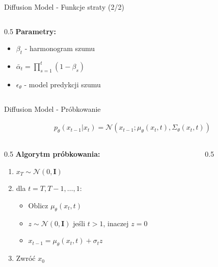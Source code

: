 \documentclass{beamer}
\begin{document}
\begin{frame}{Diffusion Model - Funkcje straty (2/2)}
\begin{columns}
        \begin{column}{0.5\textwidth}
            \textbf{Parametry:}
            \begin{itemize}
                \item $\beta_t$ - harmonogram szumu
                \item $\bar{\alpha}_t = \prod_{s=1}^{t} (1-\beta_s)$
                \item $\epsilon_\theta$ - model predykcji szumu
            \end{itemize}
        \end{column}
    \end{columns}
\end{frame}

\begin{frame}{Diffusion Model - Próbkowanie}
    \begin{tcolorbox}[colback=yellow!10!white, colframe=black!60, boxrule=0.5pt, arc=3mm, boxsep=0pt, top=0pt, bottom=0pt]
        \vspace{-5pt}
        \begin{align*}
            p_\theta(x_{t-1}|x_t) = \mathcal{N}(x_{t-1}; \mu_\theta(x_t, t), \Sigma_\theta(x_t, t))
        \end{align*}
        \vspace{-8pt}
    \end{tcolorbox}

    \begin{columns}
        \begin{column}{0.5\textwidth}
            \textbf{Algorytm próbkowania:}
            \begin{enumerate}
                \item $x_T \sim \mathcal{N}(0, \mathbf{I})$
                \item dla $t = T, T-1, \ldots, 1$:
                      \begin{itemize}
                          \item Oblicz $\mu_\theta(x_t, t)$
                          \item $z \sim \mathcal{N}(0, \mathbf{I})$ jeśli $t > 1$, inaczej $z = 0$
                          \item $x_{t-1} = \mu_\theta(x_t, t) + \sigma_t z$
                      \end{itemize}
                \item Zwróć $x_0$
            \end{enumerate}
        \end{column}
        \begin{column}{0.5\textwidth}
            \centering
\end{column}
\end{columns}
\end{frame}
\end{document}
